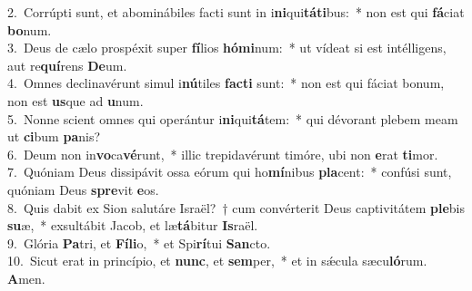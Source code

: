 {2.~}Corrúpti sunt, et abominábiles facti sunt in i\textbf{ni}qui\textbf{tá}\textbf{ti}bus:~* non est qui \textbf{fá}ciat \textbf{bo}num.\\
{3.~}Deus de cælo prospéxit super \textbf{fí}lios \textbf{hó}\textbf{mi}num:~* ut vídeat si est intélligens, aut re\textbf{quí}rens \textbf{De}um.\\
{4.~}Omnes declinavérunt simul i\textbf{nú}tiles \textbf{fa}\textbf{cti} sunt:~* non est qui fáciat bonum, non est \textbf{us}que ad \textbf{u}num.\\
{5.~}Nonne scient omnes qui operántur i\textbf{ni}qui\textbf{tá}tem:~* qui dévorant plebem meam ut \textbf{ci}bum \textbf{pa}nis?\\
{6.~}Deum non in\textbf{vo}ca\textbf{vé}runt,~* illic trepidavérunt timóre, ubi non \textbf{e}rat \textbf{ti}mor.\\
{7.~}Quóniam Deus dissipávit ossa eórum qui ho\textbf{mí}nibus \textbf{pla}cent:~* confúsi sunt, quóniam Deus \textbf{spre}vit \textbf{e}os.\\
{8.~}Quis dabit ex Sion salutáre Israël?~† cum convérterit Deus captivitátem \textbf{ple}bis \textbf{su}æ,~* exsultábit Jacob, et læ\textbf{tá}bitur \textbf{Is}raël.\\
{9.~}Glória \textbf{Pa}tri, et \textbf{Fí}\textbf{li}o,~* et Spi\textbf{rí}tui \textbf{San}cto.\\
{10.~}Sicut erat in princípio, et \textbf{nunc}, et \textbf{sem}per,~* et in sǽcula sæcu\textbf{ló}rum. \textbf{A}men.\\
